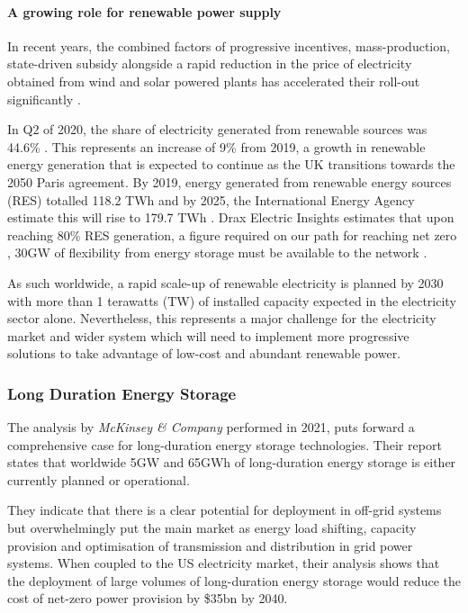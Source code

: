\documentclass[preprint,12pt]{elsarticle}
\begin{document}
\paragraph{A growing role for renewable power supply}
In recent years, the combined factors of progressive incentives, mass-production, state-driven subsidy alongside a rapid reduction in the price of electricity obtained from wind and solar powered plants has accelerated their roll-out significantly \cite{R3} \cite{hydrogen2030015}. 

In Q2 of 2020, the share of electricity generated from renewable sources was 44.6\% \cite{ENERGYtrends}. This represents an increase of 9\% from 2019, a growth in renewable energy generation that is expected to continue as the UK transitions towards the 2050 Paris agreement. By 2019, energy generated from renewable energy sources (RES) totalled 118.2 TWh and by 2025, the International Energy Agency estimate this will rise to 179.7 TWh \cite{IEAdata}.  Drax Electric Insights estimates that upon reaching 80\% RES generation, a figure required on our path for reaching net zero \cite{cccreport}, 30GW of flexibility from energy storage must be available to the network \cite{SCHMIDT201981}.

As such worldwide, a rapid scale-up of renewable electricity is planned by 2030 with more than 1 terawatts (TW) of installed capacity expected in the electricity sector alone. Nevertheless, this represents a major challenge for the electricity market and wider system which will need to implement more progressive solutions to take advantage of low-cost and abundant renewable power. 

\subsubsection{Long Duration Energy Storage}
The analysis by \textit{McKinsey \& Company} \cite{LDESCouncil} performed in 2021, puts forward a comprehensive case for long-duration energy storage technologies. Their report states that worldwide 5GW and 65GWh of long-duration energy storage is either currently planned or operational. 

They indicate that there is a clear potential for deployment in off-grid systems but overwhelmingly put the main market as energy load shifting, capacity provision and optimisation of transmission and distribution in grid power systems. When coupled to the US electricity market, their analysis shows that the deployment of large volumes of long-duration energy storage would reduce the cost of net-zero power provision by \$35bn by 2040.
\end{document}
